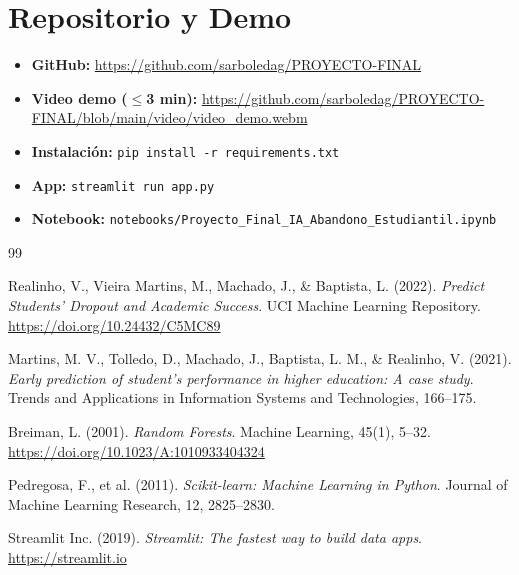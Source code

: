 \documentclass[10pt,twocolumn]{article}
\begin{document}
\section*{Repositorio y Demo}

\begin{itemize}[leftmargin=*,topsep=2pt,itemsep=1pt]
  \item \textbf{GitHub:} \url{https://github.com/sarboledag/PROYECTO-FINAL}
  \item \textbf{Video demo ($\leq$3 min):} \url{https://github.com/sarboledag/PROYECTO-FINAL/blob/main/video/video_demo.webm}
  \item \textbf{Instalación:} \texttt{pip install -r requirements.txt}
  \item \textbf{App:} \texttt{streamlit run app.py}
  \item \textbf{Notebook:} \texttt{notebooks/Proyecto\_Final\_IA\_Abandono\_Estudiantil.ipynb}
\end{itemize}

\begin{thebibliography}{99}

Realinho, V., Vieira Martins, M., Machado, J., \& Baptista, L. (2022).
\textit{Predict Students' Dropout and Academic Success}.
UCI Machine Learning Repository.
\url{https://doi.org/10.24432/C5MC89}

Martins, M. V., Tolledo, D., Machado, J., Baptista, L. M., \& Realinho, V. (2021).
\textit{Early prediction of student's performance in higher education:
A case study}.
Trends and Applications in Information Systems and Technologies, 166--175.

Breiman, L. (2001).
\textit{Random Forests}.
Machine Learning, 45(1), 5--32.
\url{https://doi.org/10.1023/A:1010933404324}

Pedregosa, F., et al. (2011).
\textit{Scikit-learn: Machine Learning in Python}.
Journal of Machine Learning Research, 12, 2825--2830.

Streamlit Inc. (2019).
\textit{Streamlit: The fastest way to build data apps}.
\url{https://streamlit.io}

\end{thebibliography}
\end{document}
